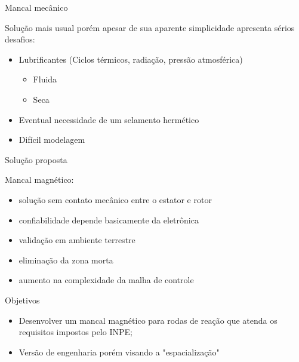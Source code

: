 \documentclass{beamer}
\begin{document}
\begin{frame}{Mancal mecânico}
	
	Solução mais usual porém apesar de sua aparente simplicidade apresenta sérios desafios:

	\begin{itemize}
		\item Lubrificantes (Ciclos térmicos, radiação, pressão atmosférica)	
		\begin{itemize}
			\item Fluida
			\item Seca
		\end{itemize}
		\item Eventual necessidade de um selamento hermético 
		\item Difícil modelagem
	\end{itemize}
	
\end{frame}

\begin{frame}{Solução proposta}

	Mancal magnético:

	\begin{itemize}
		\item solução sem contato mecânico entre o estator e rotor
		\item confiabilidade depende basicamente da eletrônica
		\item validação em ambiente terrestre 
		\item eliminação da zona morta
		\item aumento na complexidade da malha de controle
	\end{itemize}
\end{frame}

%

\begin{frame}{Objetivos}
	\begin{itemize}
		\item Desenvolver um mancal magnético para rodas de reação que atenda os requisitos impostos pelo INPE;
		\item Versão de engenharia porém visando a "espacialização"
	\end{itemize}
\end{frame}
\end{document}
